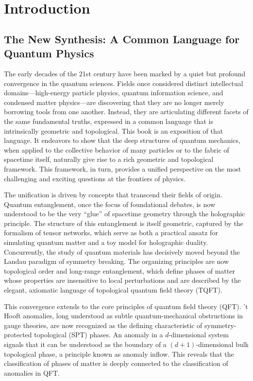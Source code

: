 \chapter*{Introduction}

\section{The New Synthesis: A Common Language for Quantum Physics}

The early decades of the 21st century have been marked by a quiet but profound convergence in the quantum sciences. Fields once considered distinct intellectual domains---high-energy particle physics, quantum information science, and condensed matter physics---are discovering that they are no longer merely borrowing tools from one another. Instead, they are articulating different facets of the same fundamental truths, expressed in a common language that is intrinsically geometric and topological. This book is an exposition of that language. It endeavors to show that the deep structures of quantum mechanics, when applied to the collective behavior of many particles or to the fabric of spacetime itself, naturally give rise to a rich geometric and topological framework. This framework, in turn, provides a unified perspective on the most challenging and exciting questions at the frontiers of physics.

The unification is driven by concepts that transcend their fields of origin. Quantum entanglement, once the focus of foundational debates, is now understood to be the very ``glue'' of spacetime geometry through the holographic principle. The structure of this entanglement is itself geometric, captured by the formalism of tensor networks, which serve as both a practical ansatz for simulating quantum matter and a toy model for holographic duality. Concurrently, the study of quantum materials has decisively moved beyond the Landau paradigm of symmetry breaking. The organizing principles are now topological order and long-range entanglement, which define phases of matter whose properties are insensitive to local perturbations and are described by the elegant, axiomatic language of topological quantum field theory (TQFT).

This convergence extends to the core principles of quantum field theory (QFT). 't Hooft anomalies, long understood as subtle quantum-mechanical obstructions in gauge theories, are now recognized as the defining characteristic of symmetry-protected topological (SPT) phases. An anomaly in a $d$-dimensional system signals that it can be understood as the boundary of a $(d+1)$-dimensional bulk topological phase, a principle known as anomaly inflow. This reveals that the classification of phases of matter is deeply connected to the classification of anomalies in QFT.

